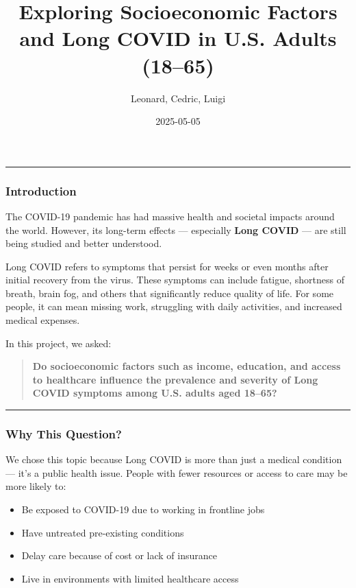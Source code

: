 \documentclass[
]{article}
\title{Exploring Socioeconomic Factors and Long COVID in U.S. Adults
(18--65)}
\author{Leonard, Cedric, Luigi}
\date{2025-05-05}
\providecommand{\tightlist}{%
  \setlength{\itemsep}{0pt}\setlength{\parskip}{0pt}}
\begin{document}
\maketitle

\begin{center}\rule{0.5\linewidth}{0.5pt}\end{center}

\subsubsection{Introduction}\label{introduction}

The COVID-19 pandemic has had massive health and societal impacts around
the world. However, its long-term effects --- especially \textbf{Long
COVID} --- are still being studied and better understood.

Long COVID refers to symptoms that persist for weeks or even months
after initial recovery from the virus. These symptoms can include
fatigue, shortness of breath, brain fog, and others that significantly
reduce quality of life. For some people, it can mean missing work,
struggling with daily activities, and increased medical expenses.

In this project, we asked:

\begin{quote}
\textbf{Do socioeconomic factors such as income, education, and access
to healthcare influence the prevalence and severity of Long COVID
symptoms among U.S. adults aged 18--65?}
\end{quote}

\begin{center}\rule{0.5\linewidth}{0.5pt}\end{center}

\subsubsection{Why This Question?}\label{why-this-question}

We chose this topic because Long COVID is more than just a medical
condition --- it's a public health issue. People with fewer resources or
access to care may be more likely to:

\begin{itemize}
\tightlist
\item
  Be exposed to COVID-19 due to working in frontline jobs\\
\item
  Have untreated pre-existing conditions\\
\item
  Delay care because of cost or lack of insurance\\
\item
  Live in environments with limited healthcare access
\end{itemize}
\end{document}
